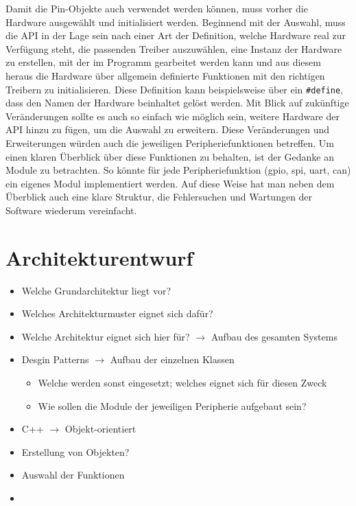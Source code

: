 Damit die Pin-Objekte auch verwendet werden können, muss vorher die Hardware ausgewählt und initialisiert werden.
Beginnend mit der Auswahl, muss die API in der Lage sein nach einer Art der Definition, welche Hardware real zur Verfügung steht, die passenden Treiber auszuwählen, eine Instanz der Hardware zu erstellen, mit der im Programm gearbeitet werden kann und aus diesem heraus die Hardware über allgemein definierte Funktionen mit den richtigen Treibern zu initialisieren.
Diese Definition kann beispielsweise über ein \texttt{\#define}, dass den Namen der Hardware beinhaltet gelöst werden.
Mit Blick auf zukünftige Veränderungen sollte es auch so einfach wie möglich sein, weitere Hardware der API hinzu zu fügen, um die Auswahl zu erweitern.
Diese Veränderungen und Erweiterungen würden auch die jeweiligen Peripheriefunktionen betreffen.
Um einen klaren Überblick über diese Funktionen zu behalten, ist der Gedanke an Module zu betrachten.
So könnte für jede Peripheriefunktion (\gls{gpio}, \gls{spi}, \gls{uart}, \gls{can}) ein eigenes Modul implementiert werden.
Auf diese Weise hat man neben dem Überblick auch eine klare Struktur, die Fehlersuchen und Wartungen der Software wiederum vereinfacht.



\section{Architekturentwurf}

\begin{itemize}
	\item Welche Grundarchitektur liegt vor?
	\item Welches Architekturmuster eignet sich dafür?
	\item Welche Architektur eignet sich hier für? $\rightarrow$ Aufbau des gesamten Systems
	\item Desgin Patterns $\rightarrow$ Aufbau der einzelnen Klassen
	\begin{itemize}
		\item Welche werden sonst eingesetzt; welches eignet sich für diesen Zweck
		\item Wie sollen die Module der jeweiligen Peripherie aufgebaut sein?
	\end{itemize}
	\item C++ $\rightarrow$ Objekt-orientiert
	\item Erstellung von Objekten?
	\item Auswahl der Funktionen
	\item 
\end{itemize}

